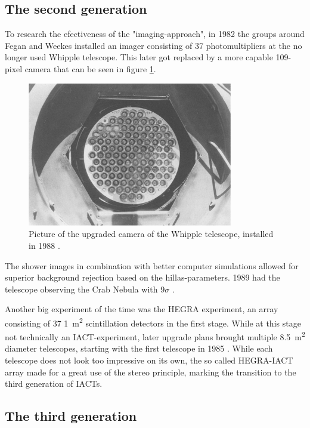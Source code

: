 \subsection{The second generation}
To research the efectiveness of the "imaging-approach", in 1982 the groups around Fegan and Weekes
installed an imager consisting of 37 photomultipliers at the no longer used Whipple telescope.
This later got replaced by a more capable 109-pixel camera that can be seen in figure \ref{fig:whipple_cam}.

\begin{figure}
    \includegraphics[width=0.8\textwidth]{images/whipple_cam.png}
    \caption{Picture of the upgraded camera of the Whipple telescope, installed in 1988 \cite{Cawley1995}.}  %
    \label{fig:whipple_cam}
\end{figure}

The shower images in combination with better computer simulations allowed for 
superior background rejection based on the  hillas-parameters.
1989 had the telescope observing the Crab Nebula with 9$\sigma$ 
\cite{1989ApJ...342..379W}.


Another big experiment of the time was the HEGRA experiment, an array consisting 
of 37 \SI{1}{\meter^2} scintillation detectors \cite{ALLKOFER1990345} in the first stage.
While at this stage not technically an IACT-experiment, later upgrade plans
brought multiple \SI{8.5}{\meter^2} diameter telescopes, starting with the first 
telescope in 1985 \cite{DAUM19971}.
While each telescope does not look too impressive on its own,
the so called HEGRA-IACT array made for a great use of the stereo principle,
marking the transition to the third generation of IACTs.


\subsection{The third generation}

